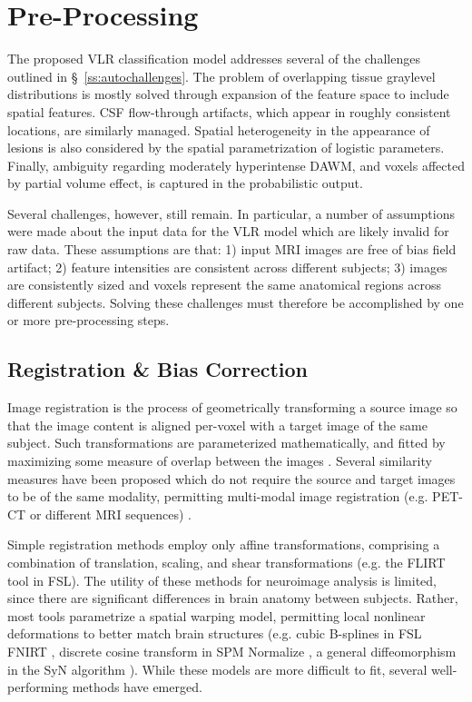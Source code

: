 \section{Pre-Processing}\label{s:meth-pre}
The proposed VLR classification model addresses several of the challenges outlined in \S\ \ref{ss:autochallenges}.
The problem of overlapping tissue graylevel distributions is mostly solved through expansion of the feature space to include spatial features.
CSF flow-through artifacts, which appear in roughly consistent locations, are similarly managed.
Spatial heterogeneity in the appearance of lesions is also considered by the spatial parametrization of logistic parameters.
Finally, ambiguity regarding moderately hyperintense DAWM, and voxels affected by partial volume effect, is captured in the probabilistic output.
\par
Several challenges, however, still remain.
In particular, a number of assumptions were made about the input data for the VLR model which are likely invalid for raw data.
These assumptions are that:
1) input MRI images are free of bias field artifact;
2) feature intensities are consistent across different subjects;
3) images are consistently sized and voxels represent the same anatomical regions across different subjects.
Solving these challenges must therefore be accomplished by one or more pre-processing steps.
\subsection{Registration \& Bias Correction}\label{ss:meth-reg+bias}
Image registration is the process of geometrically transforming a source image so that the image content is aligned per-voxel with a target image of the same subject.
Such transformations are parameterized mathematically, and fitted by maximizing some measure of overlap between the images \cite{Sotiras2013}.
Several similarity measures have been proposed which do not require the source and target images to be of the same modality, permitting multi-modal image registration (e.g. PET-CT or different MRI sequences) \cite{Maes1997,Klein2009,Sotiras2013}.
\par
Simple registration methods employ only affine transformations, comprising a combination of translation, scaling, and shear transformations (e.g. the FLIRT tool \cite{Jenkinson2002} in FSL).
The utility of these methods for neuroimage analysis is limited, since there are significant differences in brain anatomy between subjects.
Rather, most tools parametrize a spatial warping model, permitting local nonlinear deformations to better match brain structures (e.g.
cubic B-splines in FSL FNIRT \cite{Andersson2007},
discrete cosine transform in SPM Normalize \cite{Ashburner1997,Ashburner2005},
a general diffeomorphism in the SyN algorithm \cite{Avants2008}).
While these models are more difficult to fit, several well-performing methods have emerged.


